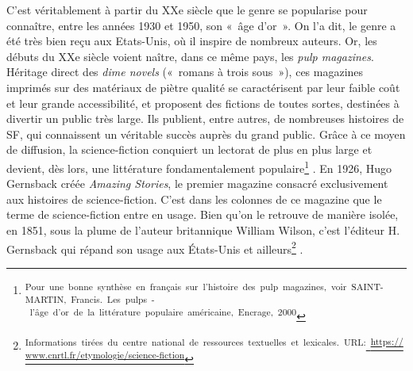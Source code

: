 \documentclass[letterpaper,portrait,12pt]{article}
\begin{document}
	C'est v\'{e}ritablement \`{a} partir du XXe si\`{e}cle que le genre se popularise pour conna\^{i}tre, entre les ann\'{e}es 1930 et 1950, son « \^{a}ge d'or ». On l'a dit, le genre a \'{e}t\'{e} tr\`{e}s bien re\c{c}u aux Etats-Unis, où il inspire de nombreux auteurs. Or, les d\'{e}buts du XXe si\`{e}cle voient na\^{i}tre, dans ce m\^{e}me pays, les \emph{pulp magazines}. H\'{e}ritage direct des \emph{dime novels }(« romans \`{a} trois sous »), ces magazines imprim\'{e}s sur des mat\'{e}riaux de pi\`{e}tre qualit\'{e} se caract\'{e}risent par leur faible co\^{u}t et leur grande accessibilit\'{e}, et proposent des fictions de toutes sortes, destin\'{e}es \`{a} divertir un public tr\`{e}s large. Ils publient, entre autres, de nombreuses histoires de SF, qui connaissent un v\'{e}ritable succ\`{e}s aupr\`{e}s du grand public. Gr\^{a}ce \`{a} ce moyen de diffusion, la science-fiction conquiert un lectorat de plus en plus large et devient, d\`{e}s lors, une litt\'{e}rature fondamentalement populaire\footnote{\textsuperscript{\newpage
}\textsuperscript{	Pour\ une\ bonne\ synth\`{e}se\ en\ fran\c{c}ais\ sur\ l'histoire\ des\ pulp\ magazines,\ voir\ SAINT-MARTIN,\ Francis.\ Les\ pulps\ -\ l'\^{a}ge\ d'or\ de\ la\ litt\'{e}rature\ populaire\ am\'{e}ricaine,\ Encrage,\ 2000}} . En 1926, Hugo Gernsback cr\'{e}\'{e}e \emph{Amazing Stories}, le premier magazine consacr\'{e} exclusivement aux histoires de science-fiction. C'est dans les colonnes de ce magazine que le terme de science-fiction entre en usage. Bien qu'on le retrouve de mani\`{e}re isol\'{e}e, en 1851, sous la plume de l'auteur britannique William Wilson, c'est l'\'{e}diteur H. Gernsback qui r\'{e}pand son usage aux \'{E}tats-Unis et ailleurs\footnote{\textsuperscript{\newpage
}\textsuperscript{	}\textsuperscript{{\tiny Informations\ tir\'{e}es\ du\ centre\ national\ de\ ressources\ textuelles\ et\ lexicales.\ URL:}}\href{https://www.cnrtl.fr/etymologie/science-fiction}{\textsuperscript{{\tiny \ }}}\href{https://www.cnrtl.fr/etymologie/science-fiction}{\textsuperscript{\textcolor[rgb]{0.000,0.082,0.361}{{\tiny \uline{https://www.cnrtl.fr/etymologie/science-fiction}}}}}} . 
\end{document}
